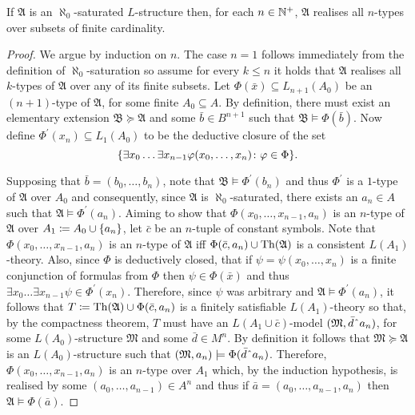\begin{prp}\label{prp:sat0}
	If $\mathfrak{A}$ is an $\aleph_0$-saturated $L$-structure then, for each $n\in\mathbb{N}^{+}$, $\mathfrak{A}$ realises all $n$-types over subsets of finite cardinality.
\end{prp}
\begin{proof}
	We argue by induction on $n$.  The case $n=1$ follows immediately from the definition of $\aleph_0$-saturation so assume for every $k\leq n$ it holds that $\mathfrak{A}$ realises all $k$-types of $\mathfrak{A}$ over any of its finite subsets.  Let $\Phi(\bar{x})\subseteq L_{n+1}(A_0)$ be an $(n+1)$-type of $\mathfrak{A}$, for some finite $A_0\subseteq A$.  By definition, there must exist an elementary extension $\mathfrak{B}\succcurlyeq\mathfrak{A}$ and some $\bar{b}\in B^{n+1}$ such that $\mathfrak{B}\models\Phi(\bar{b})$.  Now define $\Phi^\prime(x_n)\subseteq L_1(A_0)$ to be the deductive closure of the set
	\begin{equation}
		\lbrace \exists x_0\dotso\exists x_{n-1}\varphi(x_0,\dotsc,x_n)\colon \varphi\in\Phi \rbrace.
	\end{equation}

	Supposing that $\bar{b}=(b_0,\dotsc,b_n)$, note that $\mathfrak{B}\models\Phi^\prime(b_n)$ and thus $\Phi^\prime$ is a $1$-type of $\mathfrak{A}$ over $A_0$ and consequently, since $\mathfrak{A}$ is $\aleph_0$-saturated, there exists an $a_n\in A$ such that $\mathfrak{A}\models\Phi^\prime(a_n)$.  Aiming to show that $\Phi(x_0,\dotsc,x_{n-1},a_n)$ is an $n$-type of $\mathfrak{A}$ over $A_1\coloneqq A_0\cup\lbrace a_n\rbrace$, let $\bar{c}$ be an $n$-tuple of constant symbols.  Note that $\Phi(x_0,\dotsc,x_{n-1},a_n)$ is an $n$-type of $\mathfrak{A}$ iff $\Phi(\bar{c},a_n)\cup\operatorname{Th}(\mathfrak{A})$ is a consistent $L(A_1)$-theory.  Also, since $\Phi$ is deductively closed, that if $\psi=\psi(x_0,\dotsc,x_n)$ is a finite conjunction of formulas from $\Phi$ then $\psi\in\Phi(\bar{x})$ and thus $\exists x_0\dotso\exists x_{n-1}\psi\in\Phi^\prime(x_n)$.  Therefore, since $\psi$ was arbitrary and $\mathfrak{A}\models\Phi^\prime(a_n)$, it follows that $T\coloneqq\operatorname{Th}(\mathfrak{A})\cup\Phi(\bar{c},a_n)$ is a finitely satisfiable $L(A_1)$-theory so that, by the compactness theorem, $T$ must have an $L(A_1\cup\bar{c})$-model $(\mathfrak{M},\bar{d}\string^a_n)$, for some $L(A_0)$-structure $\mathfrak{M}$ and some $\bar{d}\in M^n$.  By definition it follows that $\mathfrak{M}\succcurlyeq\mathfrak{A}$ is an $L(A_0)$-structure such that $(\mathfrak{M},a_n)\models\Phi(\bar{d}\string^a_n)$.  Therefore, $\Phi(x_0,\dotsc,x_{n-1},a_n)$ is an $n$-type over $A_1$ which, by the induction hypothesis, is realised by some $(a_0,\dotsc,a_{n-1})\in A^n$ and thus if $\bar{a}=(a_0,\dotsc,a_{n-1},a_n)$ then $\mathfrak{A}\models\Phi(\bar{a})$.
\end{proof}

